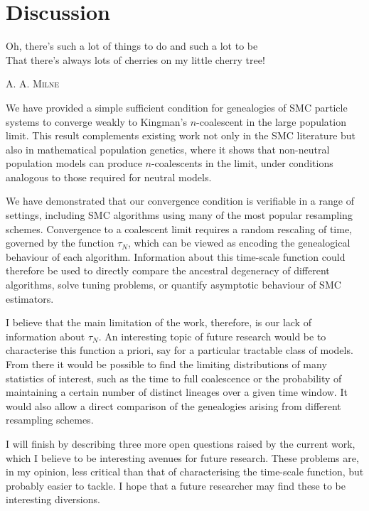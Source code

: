 \chapter{Discussion}

\epigraph{
Oh, there's such a lot of things to do and such a lot to be\\
That there's always lots of cherries on my little cherry tree!
}
{\textsc{A. A. Milne}}

We have provided a simple sufficient condition for genealogies of SMC particle systems to converge weakly to Kingman's $n$-coalescent in the large population limit. 
This result complements existing work not only in the SMC literature but also in mathematical population genetics, where it shows that non-neutral population models can produce $n$-coalescents in the limit, under conditions analogous to those required for neutral models.

We have demonstrated that our convergence condition is verifiable in a range of settings, including SMC algorithms using many of the most popular resampling schemes. 
Convergence to a coalescent limit requires a random rescaling of time, governed by the function $\tau_N$, which can be viewed as encoding the genealogical behaviour of each algorithm.
Information about this time-scale function could therefore be used to directly compare the ancestral degeneracy of different algorithms, solve tuning problems, or quantify asymptotic behaviour of SMC estimators.

I believe that the main limitation of the work, therefore, is our lack of information about $\tau_N$. An interesting topic of future research would be to characterise this function a priori, say for a particular tractable class of models.
From there it would be possible to find the limiting distributions of many statistics of interest, such as the time to full coalescence or the probability of maintaining a certain number of distinct lineages over a given time window. It would also allow a direct comparison of the genealogies arising from different resampling schemes.

I will finish by describing three more open questions raised by the current work, which I believe to be interesting avenues for future research. These problems are, in my opinion, less critical than that of characterising the time-scale function, but probably easier to tackle. 
I hope that a future researcher may find these to be interesting diversions.

